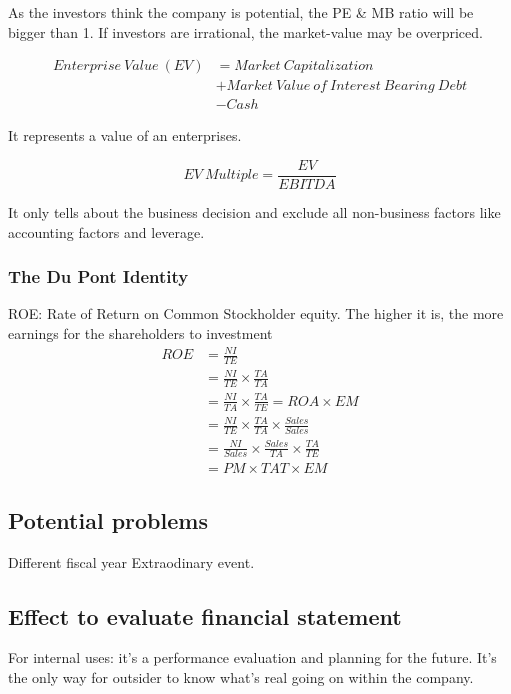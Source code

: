 \documentclass[10pt, a4paper]{article}
\begin{document}
            As the investors think the company is potential, the PE \& MB ratio will be bigger than 1. If investors are irrational, the market-value may be overpriced. 

            \begin{align*}
                Enterprise\ Value\ (EV) &= Market\ Capitalization \\
                                        &+ Market\ Value\ of\ Interest\ Bearing\ Debt \\
                                        &- Cash
            \end{align*}

            It represents a value of an enterprises. 

            $$EV\ Multiple = \frac{EV}{EBITDA}$$

            It only tells about the business decision and exclude all non-business factors like accounting factors and leverage. 
            
        \subsubsection{The Du Pont Identity}
            ROE: Rate of Return on Common Stockholder equity. The higher it is, the more earnings for the shareholders to investment 
            \begin{align*}
                ROE &= \frac{NI}{TE} \\
                    &= \frac{NI}{TE} \times \frac{TA}{TA} \\
                    &= \frac{NI}{TA} \times \frac{TA}{TE} = ROA \times EM \\
                    &= \frac{NI}{TE} \times \frac{TA}{TA} \times \frac{Sales}{Sales}\\
                    &= \frac{NI}{Sales} \times \frac{Sales}{TA} \times \frac{TA}{TE}\\
                    &= PM \times TAT \times EM
            \end{align*}
    \subsection{Potential problems}
        Different fiscal year
        Extraodinary event. 
    
    \subsection{Effect to evaluate financial statement}
        For internal uses: it's a performance evaluation and planning for the future. 
        It's the only way for outsider to know what's real going on within the company.
        
\end{document}
